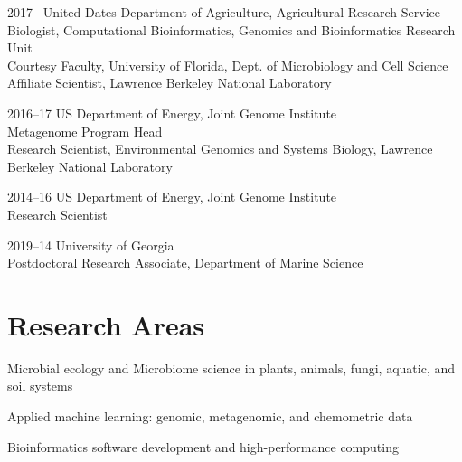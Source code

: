 \documentclass[12pt,letterpaper]{report}
\newcommand{\listitemspace}{0.15em}
\renewenvironment{itemize}
{\begin{list}{}{\setlength{\leftmargin}{0em}
            \setlength{\parskip}{0em}
            \setlength{\itemsep}{\listitemspace}
            \setlength{\parsep}{\listitemspace}}}
    {\end{list}}
\begin{document}
    \begin{tablist}

        \item[2017--]   \tab United Dates Department of Agriculture, Agricultural Research Service \\
                             Biologist, Computational Bioinformatics, Genomics and Bioinformatics Research Unit\\
                             \tab Courtesy Faculty, University of Florida, Dept. of Microbiology and Cell Science\\
                             \tab Affiliate Scientist, Lawrence Berkeley National Laboratory
                            

        \item[2016--17] \tab US Department of Energy, Joint Genome Institute \\
                             Metagenome Program Head \\
                             Research Scientist, Environmental Genomics and Systems Biology, Lawrence Berkeley National Laboratory \\
                             
        \item[2014--16] \tab US Department of Energy, Joint Genome Institute \\
                             Research Scientist  \\

        \item[2019--14] \tab University of Georgia \\
                             Postdoctoral Research Associate, Department of Marine Science
                             
		  

    \end{tablist}

    \section*{Research Areas}

    \begin{itemize}

        \item Microbial ecology and Microbiome science in plants, animals, fungi, aquatic, and soil systems

        \item Applied machine learning: genomic, metagenomic, and chemometric data 

        \item Bioinformatics software development and high-performance computing

    \end{itemize}
\end{document}
